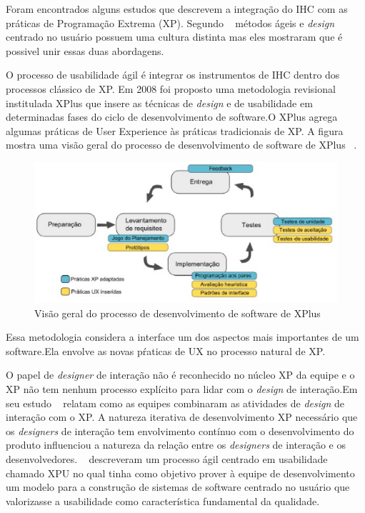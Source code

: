 Foram encontrados alguns estudos que descrevem a integração do IHC com as práticas de Programação Extrema (XP). Segundo ~ métodos ágeis e \emph{design} centrado no usuário possuem uma cultura distinta mas eles mostraram que é possivel unir essas duas abordagens.

O processo de usabilidade ágil é integrar os instrumentos de IHC dentro dos processos clássico de XP. %
%
Em 2008 foi proposto uma metodologia revisional institulada XPlus que insere as técnicas de \emph{design} e de usabilidade em determinadas fases do ciclo de desenvolvimento de software.O XPlus agrega algumas práticas de User Experience às práticas tradicionais de XP. A figura mostra uma visão geral do processo de desenvolvimento de software de XPlus ~\cite{guimaraesxplus}.

\begin{figure}[h]
    \centering
    \includegraphics[keepaspectratio=true,scale=0.60]
      {figuras/xplus.eps}
    \caption{Visão geral do processo de desenvolvimento de software de XPlus}
    \label{ciclo_xplus}
\end{figure}

Essa metodologia considera a interface um dos aspectos mais importantes de um software.Ela envolve as novas pŕaticas de UX no processo natural de XP.

O papel de \emph{designer} de interação não é reconhecido no núcleo XP da equipe e o XP não tem nenhum processo explícito para lidar com o \emph{design} de interação.Em seu estudo ~ relatam como as equipes combinaram as atividades de \emph{design} de interação com o XP. 
%
A natureza iterativa de desenvolvimento XP necessário que os \emph{designers} de interação tem envolvimento contínuo com o desenvolvimento do produto influenciou a natureza da relação entre os \emph{designers} de interação e os desenvolvedores.
%
~ descreveram um processo ágil centrado em usabilidade chamado XPU no qual tinha como objetivo prover à equipe de desenvolvimento um modelo para a construção de sistemas de software centrado no usuário que valorizasse a usabilidade como característica fundamental da qualidade. 

